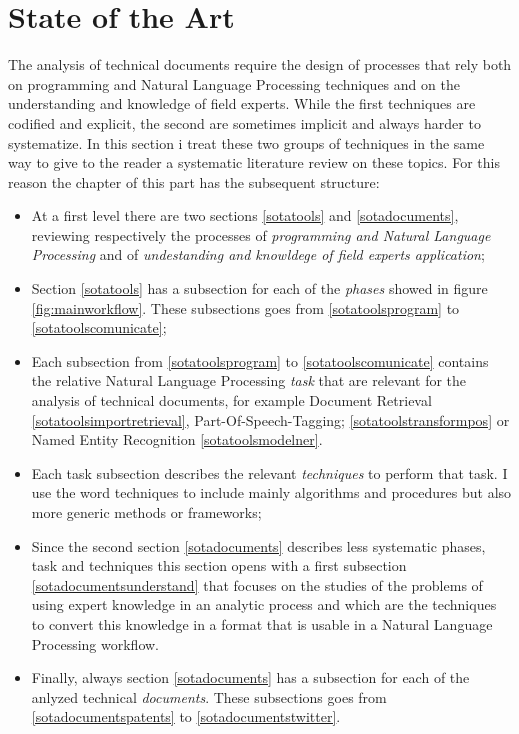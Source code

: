 \documentclass[]{book}
\providecommand{\tightlist}{%
  \setlength{\itemsep}{0pt}\setlength{\parskip}{0pt}}
\begin{document}
\part{State of the Art}\label{part-state-of-the-art}

The analysis of technical documents require the design of processes that
rely both on programming and Natural Language Processing techniques and
on the understanding and knowledge of field experts. While the first
techniques are codified and explicit, the second are sometimes implicit
and always harder to systematize. In this section i treat these two
groups of techniques in the same way to give to the reader a systematic
literature review on these topics. For this reason the chapter of this
part has the subsequent structure:

\begin{itemize}
\tightlist
\item
  At a first level there are two sections \ref{sotatools} and
  \ref{sotadocuments}, reviewing respectively the processes of
  \emph{programming and Natural Language Processing} and of
  \emph{undestanding and knowldege of field experts application};
\item
  Section \ref{sotatools} has a subsection for each of the \emph{phases}
  showed in figure \ref{fig:mainworkflow}. These subsections goes from
  \ref{sotatoolsprogram} to \ref{sotatoolscomunicate};
\item
  Each subsection from \ref{sotatoolsprogram} to
  \ref{sotatoolscomunicate} contains the relative Natural Language
  Processing \emph{task} that are relevant for the analysis of technical
  documents, for example Document Retrieval
  \ref{sotatoolsimportretrieval}, Part-Of-Speech-Tagging;
  \ref{sotatoolstransformpos} or Named Entity Recognition
  \ref{sotatoolsmodelner}.
\item
  Each task subsection describes the relevant \emph{techniques} to
  perform that task. I use the word techniques to include mainly
  algorithms and procedures but also more generic methods or frameworks;
\item
  Since the second section \ref{sotadocuments} describes less systematic
  phases, task and techniques this section opens with a first subsection
  \ref{sotadocumentsunderstand} that focuses on the studies of the
  problems of using expert knowledge in an analytic process and which
  are the techniques to convert this knowledge in a format that is
  usable in a Natural Language Processing workflow.
\item
  Finally, always section \ref{sotadocuments} has a subsection for each
  of the anlyzed technical \emph{documents}. These subsections goes from
  \ref{sotadocumentspatents} to \ref{sotadocumentstwitter}.
\end{itemize}
\end{document}
